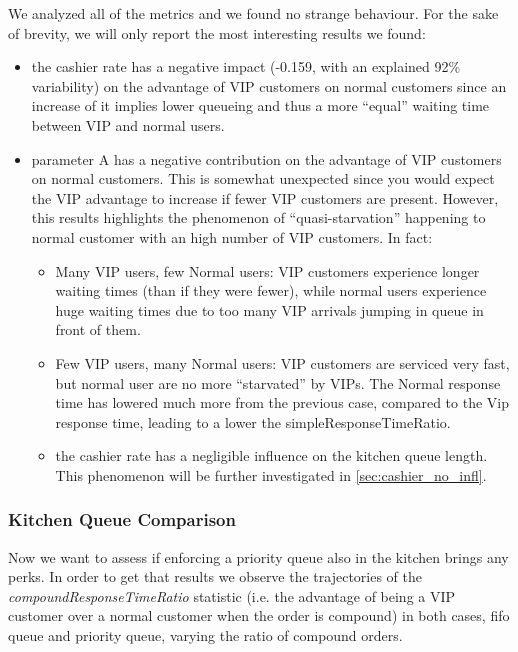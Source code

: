 We analyzed all of the metrics and we found no strange behaviour. For the sake of brevity, we will only report the most interesting results we found:
\begin{itemize}
  \item the cashier rate has a negative impact (-0.159, with an explained 92\%
   variability) on the advantage of VIP customers 
    on normal customers since an increase of it implies lower queueing and thus 
    a more ``equal'' waiting time between VIP and normal users.
  \item parameter A has a negative contribution on the advantage of VIP       
    customers on normal customers. This is somewhat unexpected since you would 
    expect the VIP advantage to increase if fewer VIP customers are present.
    However, this results highlights the phenomenon of ``quasi-starvation''
    happening to normal customer with an high number of VIP customers. In fact:
      \begin{itemize}
        \item Many VIP users, few Normal users: VIP customers experience longer 
          waiting times (than if they were fewer), while normal users experience huge waiting times due to too many VIP arrivals jumping in queue in front of them.
        \item Few VIP users, many Normal users: VIP customers are serviced very fast, but normal user are no more ``starvated'' by VIPs. The Normal response time has lowered much more from the previous case, compared to the Vip response time, leading to a lower the simpleResponseTimeRatio.
        \item the cashier rate has a negligible influence on the kitchen queue length. This phenomenon will be further investigated in \cref{sec:cashier_no_infl}.
      \end{itemize}
\end{itemize} %

\subsubsection{Kitchen Queue Comparison}

Now we want to assess if enforcing a priority queue also in the kitchen brings any perks. In order to get that results we observe the trajectories of the \emph{compoundResponseTimeRatio} statistic (i.e. the advantage of being a VIP customer over a normal customer when the order is compound) in both cases, fifo queue and priority queue, varying the ratio of compound orders.

